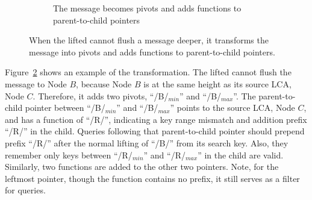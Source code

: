 \begin{figure}
\begin{subfigure}{\textwidth}
        \caption{\label{subfig:spvt-2} The \goto message becomes pivots and
            adds \xf functions to parent-to-child pointers}
    \end{subfigure}
    \caption[Transform a \goto message into pivots]{\label{fig:spvt}
        When the lifted \bedag cannot flush a \goto message deeper, it
        transforms the \goto message into pivots and adds \xf functions to
        parent-to-child pointers.}
\end{figure}

Figure~\ref{fig:spvt} shows an example of the transformation.
The lifted \bedag cannot flush the \goto message to Node $B$, because Node $B$
is at the same height as its source LCA, Node $C$.
Therefore, it adds two pivots, ``/B/$_{min}$'' and ``/B/$_{max}$''.
The parent-to-child pointer between ``/B/$_{min}$'' and ``/B/$_{max}$'' points
to the source LCA, Node $C$, and has a \xf function of ``/R/'', indicating a
key range mismatch and addition prefix ``/R/'' in the child.
Queries following that parent-to-child pointer should prepend prefix ``/R/''
after the normal lifting of ``/B/'' from its search key.
Also, they remember only keys between ``/R/$_{min}$'' and ``/R/$_{max}$'' in
the child are valid.
Similarly, two \xf functions are added to the other two pointers.
Note, for the leftmost pointer, though the \xf function contains no prefix,
it still serves as a filter for queries.

